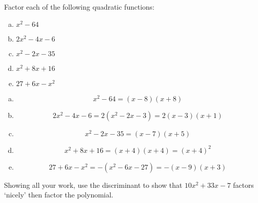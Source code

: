 \documentclass[11pt,letterpaper]{article}
\begin{document}

 Factor each of the following quadratic functions:
	\begin{enumerate}[(a)]
	\item $x^2 - 64$
	\item $2x^2 - 4x - 6$
	\item $x^2 - 2x - 35$
	\item $x^2 + 8x + 16$
	\item $27 + 6x - x^2$
	\end{enumerate} \pspace

\sol 
\begin{enumerate}[(a)]
\item 
	\[
	x^2 - 64= (x - 8)(x + 8)
	\] \pspace

\item 
	\[
	2x^2 - 4x - 6= 2(x^2 - 2x - 3)= 2(x - 3)(x + 1)
	\] \pspace

\item 
	\[
	x^2 - 2x - 35= (x - 7)(x + 5)
	\] \pspace

\item 
	\[
	x^2 + 8x + 16= (x + 4)(x + 4)= (x + 4)^2
	\] \pspace

\item 
	\[
	27 + 6x - x^2= -(x^2 - 6x - 27)= -(x - 9)(x + 3)
	\]
\end{enumerate}



\newpage



 Showing all your work, use the discriminant to show that  $10x^2 + 33x - 7$ factors `nicely' then factor the polynomial. \pspace
\end{document}

